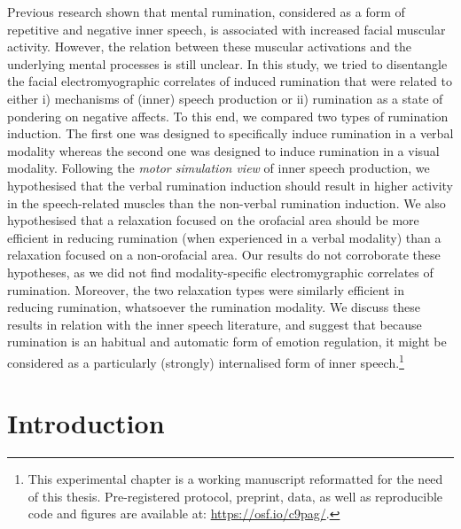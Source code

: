 \documentclass[a4paper,12pt,twoside,onecolumn,openright,final,oldfontcommands]{memoir}
\let\rmarkdownfootnote\footnote%
\def\footnote{\protect\rmarkdownfootnote}
\newcommand{\initial}[1]{
	\lettrine[lines=3,lhang=0.33,nindent=0em]{
		\color{gray}
     		{\textsc{#1}}}{}}
\begin{document}
\initial{P}revious research shown that mental rumination, considered as a form of repetitive and negative inner speech, is associated with increased facial muscular activity. However, the relation between these muscular activations and the underlying mental processes is still unclear. In this study, we tried to disentangle the facial electromyographic correlates of induced rumination that were related to either i) mechanisms of (inner) speech production or ii) rumination as a state of pondering on negative affects. To this end, we compared two types of rumination induction. The first one was designed to specifically induce rumination in a verbal modality whereas the second one was designed to induce rumination in a visual modality. Following the \emph{motor simulation view} of inner speech production, we hypothesised that the verbal rumination induction should result in higher activity in the speech-related muscles than the non-verbal rumination induction. We also hypothesised that a relaxation focused on the orofacial area should be more efficient in reducing rumination (when experienced in a verbal modality) than a relaxation focused on a non-orofacial area. Our results do not corroborate these hypotheses, as we did not find modality-specific electromygraphic correlates of rumination. Moreover, the two relaxation types were similarly efficient in reducing rumination, whatsoever the rumination modality. We discuss these results in relation with the inner speech literature, and suggest that because rumination is an habitual and automatic form of emotion regulation, it might be considered as a particularly (strongly) internalised form of inner speech.\footnote{This experimental chapter is a working manuscript reformatted for the need of this thesis. Pre-registered protocol, preprint, data, as well as reproducible code and figures are available at: \url{https://osf.io/c9pag/}.}

\hypertarget{introduction-1}{%
\section{Introduction}\label{introduction-1}}
\end{document}
